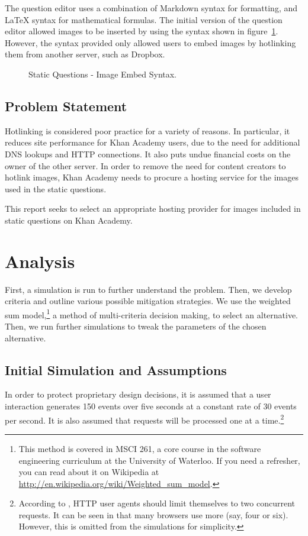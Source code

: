 \documentclass[se]{uw-wkrpt}
\begin{document}
The question editor uses a combination of Markdown syntax for formatting, and 
LaTeX syntax for mathematical formulas. The initial version of the question 
editor allowed images to be inserted by using the syntax shown in 
figure~\ref{fig:imgsyntax}. However, the syntax provided only allowed users to 
embed images by hotlinking them from another server, such as Dropbox.

\begin{figure}
  \centering
  
  \caption{Static Questions - Image Embed Syntax.}
  \label{fig:imgsyntax}
\end {figure}

\subsection{Problem Statement}\label{sec:problem}
Hotlinking is considered poor practice for a variety of reasons. In particular, 
it reduces site performance for Khan Academy users, due to the need for 
additional DNS lookups and HTTP connections. It also puts undue financial costs 
on the owner of the other server. In order to remove the need for content 
creators to hotlink images, Khan Academy needs to procure a hosting service for 
the images used in the static questions.

This report seeks to select an appropriate hosting provider for images included 
in static questions on Khan Academy.

\section{Analysis}
First, a simulation is run to further understand the problem. Then, we
develop criteria and outline various possible mitigation strategies. We use
the weighted sum model,\footnote{This method is covered in MSCI 261, a core
course in the software engineering curriculum at the University of
Waterloo. If you need a refresher, you can read about it on Wikipedia at
\url{http://en.wikipedia.org/wiki/Weighted_sum_model}.} a method of
multi-criteria decision making, to select an alternative. Then, we run
further simulations to tweak the parameters of the chosen alternative.

\subsection{Initial Simulation and Assumptions}\label{sec:assumptions}
In order to protect proprietary design decisions, it is assumed that a
user interaction generates 150 events over five seconds at a constant rate
of 30 events per second. It is also assumed that requests will be
processed one at a time.\footnote{According to \cite{ref:http}, HTTP user
agents should limit themselves to two concurrent requests. It can be seen
in \cite{ref:b423377} that many browsers use more (say, four or six).
However, this is omitted from the simulations for simplicity.}
\end{document}
